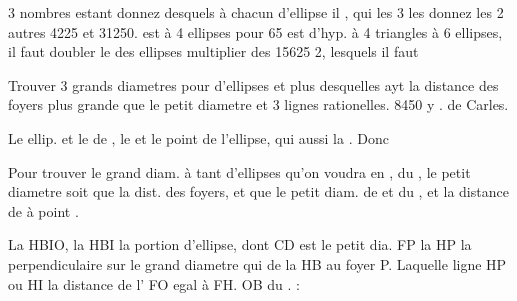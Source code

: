 \documentclass[11pt,a4paper]{article}
\begin{document}
3 nombres estant donnez desquels à chacun d'ellipse il \ill{}, qui  les 3 \ill{} les \ill{} donnez \ill{} \ill{} les 2 autres 4225 et 31250.  est à 4 ellipses pour  65 est d'hyp. à 4 triangles \ill{}  à 6 ellipses,  il faut doubler le  des ellipses \ill{} multiplier des 15625  2, lesquels il faut \ill{}

Trouver 3  grands diametres pour \ill{} \ill{} d'ellipses et plus  desquelles ayt la distance des foyers plus grande que le petit diametre et  3 lignes  rationelles. 8450 y .  \ill{} \ill{} \ill{} \ill{} \ill{} \ill{} \ill{} de Carles.

Le  \ill{} \ill{} \ill{} \ill{}  ellip. et le  de , le  et le point \ill{} \ill{} de l'ellipse, qui  aussi la \ill{} \ill{} \ill{}. Donc

Pour trouver \ill{} \ill{} le grand diam. à tant d'ellipses qu'on voudra en  \ill{} \ill{},   \ill{} du \ill{} \ill{},  le petit diametre soit  que la dist. des foyers, et que le petit diam. de \ill{} et \ill{} du \ill{}, \ill{} et la distance de \ill{} à  point  .

La  HBIO, la   HBI  la portion d'ellipse, dont CD est le petit dia. FP la  \ill{} HP la perpendiculaire sur le grand diametre qui de la  HB \ill{} au foyer P. Laquelle ligne HP ou HI \ill{} la distance de l' FO egal à FH. OB  du .  \ill{} :
\end{document}
